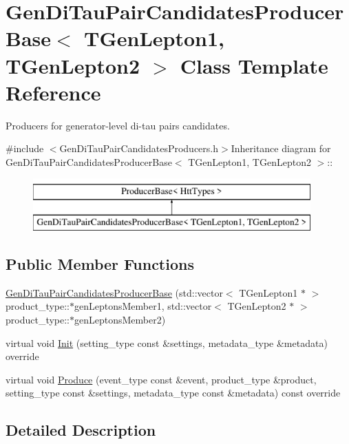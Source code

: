 \hypertarget{classGenDiTauPairCandidatesProducerBase}{
\section{GenDiTauPairCandidatesProducerBase$<$ TGenLepton1, TGenLepton2 $>$ Class Template Reference}
\label{classGenDiTauPairCandidatesProducerBase}
}


Producers for generator-\/level di-\/tau pairs candidates.  


{\ttfamily \#include $<$GenDiTauPairCandidatesProducers.h$>$}Inheritance diagram for GenDiTauPairCandidatesProducerBase$<$ TGenLepton1, TGenLepton2 $>$::\begin{figure}[H]
\begin{center}
\leavevmode
\includegraphics[height=2cm]{classGenDiTauPairCandidatesProducerBase}
\end{center}
\end{figure}
\subsection*{Public Member Functions}
\begin{DoxyCompactItemize}
\item 
\hyperlink{classGenDiTauPairCandidatesProducerBase_a882c0c0785016dc0ed619bdeec09ca71}{GenDiTauPairCandidatesProducerBase} (std::vector$<$ TGenLepton1 $\ast$ $>$ product\_\-type::$\ast$genLeptonsMember1, std::vector$<$ TGenLepton2 $\ast$ $>$ product\_\-type::$\ast$genLeptonsMember2)
\item 
virtual void \hyperlink{classGenDiTauPairCandidatesProducerBase_aabb9ae3677a8ff0af3645815a3029c58}{Init} (setting\_\-type const \&settings, metadata\_\-type \&metadata) override
\item 
virtual void \hyperlink{classGenDiTauPairCandidatesProducerBase_aaad37df429287632348ff5d1c41ea38e}{Produce} (event\_\-type const \&event, product\_\-type \&product, setting\_\-type const \&settings, metadata\_\-type const \&metadata) const override
\end{DoxyCompactItemize}


\subsection{Detailed Description}

